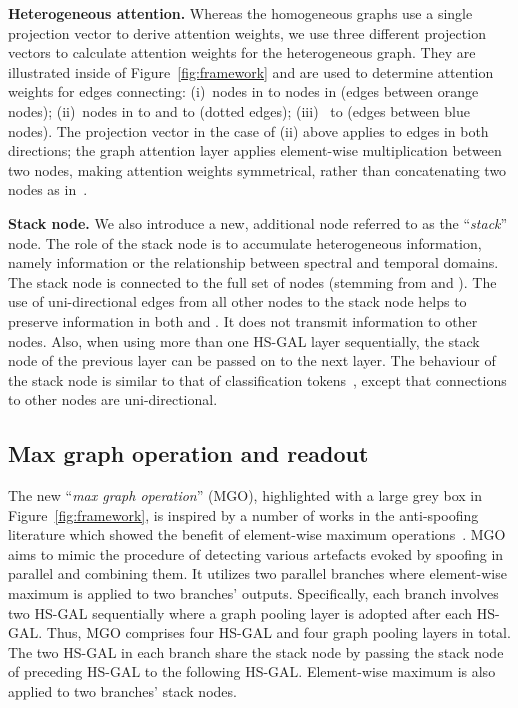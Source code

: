 \documentclass{article}
\newcommand{\newpara}[1]{\vspace{8pt}\noindent\textbf{#1}}
\begin{document}
\newpara{Heterogeneous attention.}
Whereas the homogeneous graphs use a single projection vector to derive attention weights, we use three different projection vectors to calculate attention weights for the heterogeneous graph.  
They are illustrated inside  of Figure~\ref{fig:framework} and are used to determine attention weights for edges connecting: 
(i)~nodes in  to nodes in  (edges between orange nodes); 
(ii)~nodes in  to  and  to  (dotted edges); 
(iii)~ to  (edges between blue nodes). 
The projection vector in the case of (ii) above applies to edges in both directions; the graph attention layer applies element-wise multiplication between two nodes, making attention weights symmetrical, rather than concatenating two nodes as in~\cite{velickovic2018graph}. 

\newpara{Stack node.}
We also introduce a new, additional node referred to as the ``{\em stack}'' node.
The role of the stack node is to accumulate heterogeneous information, namely information or the relationship between spectral and temporal domains. 
The stack node is connected to the full set of nodes (stemming from  and ). 
The use of uni-directional edges from all other nodes to the stack node helps to preserve information in both  and .
It does not transmit information to other nodes. 
Also, when using more than one HS-GAL layer sequentially, the stack node of the previous layer can be passed on to the next layer. 
The behaviour of the stack node is similar to that of classification tokens~\cite{kenton2019bert}, except that connections to other nodes are uni-directional.

\subsection{Max graph operation and readout}
\label{ssec:MgoReadout}
The new ``{\em max graph operation}'' (MGO), highlighted with a large grey box in Figure~\ref{fig:framework}, is inspired by a number of works in the anti-spoofing literature which showed the benefit of element-wise maximum operations~\cite{lavrentyeva2017audio,tak2021end}. 
MGO aims to mimic the procedure of detecting various artefacts evoked by spoofing in parallel and combining them.
It utilizes two parallel branches where element-wise maximum is applied to two branches' outputs. 
Specifically, each branch involves two HS-GAL sequentially where a graph pooling layer is adopted after each HS-GAL.
Thus, MGO comprises four HS-GAL and four graph pooling layers in total. 
The two HS-GAL in each branch share the stack node by passing the stack node of preceding HS-GAL to the following HS-GAL. 
Element-wise maximum is also applied to two branches' stack nodes.
\end{document}
